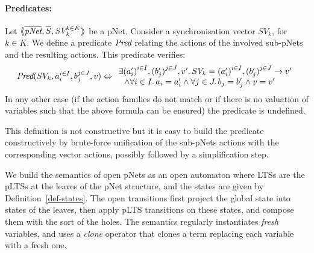 \documentclass{lncs/llncs}
\newcommand{\Pred}{\symb{Pred}}
\begin{document}

\paragraph{Predicates:}
Let
$\mylangle\overline{\pNet},\overline{S},\symb{SV}_k^{k\in K} \myrangle$
be a pNet. Consider a synchronisation vector $SV_k$, for $k\in K$. We define a
predicate $\Pred$ relating
the actions of the involved sub-pNets and the resulting actions. This predicate verifies:
\[\Pred(SV_k, a_i^{i\in I}, b_j^{j\in J}, v)\Leftrightarrow
\begin{array}{l}
\exists {(a'_i)}^{i\in I},
{(b'_j)}^{j\in J},v'.\, SV_k={(a'_i)}^{i\in I}, {(b'_j)}^{j\in J}\rightarrow v'
\\~~\land
\forall i\in I.\, a_i=a'_i\land \forall j \in J.\, b_j=b'_j \land v=v'
\end{array}\]
In any other case (if the action families do not match or if there is no valuation of
variables such that the above formula can be ensured) the predicate is undefined.

This definition is not constructive but it is easy to build the predicate constructively
by brute-force unification of the sub-pNets
actions with the corresponding vector actions, possibly followed by a simplification
step.


We build the semantics of open pNets as an open automaton where LTSs are the pLTSs at
the leaves of the pNet structure, and the states are given by 
Definition~\ref{def-states}. The open transitions first
 project the global state into states of the leaves, then apply
pLTS transitions on these states, and compose them with the sort of the holes. %
The semantics   regularly instantiates \emph{fresh} variables, and uses a
\emph{clone} operator that clones a term replacing each variable with a
fresh one.
\end{document}
